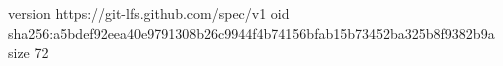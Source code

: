 version https://git-lfs.github.com/spec/v1
oid sha256:a5bdef92eea40e9791308b26c9944f4b74156bfab15b73452ba325b8f9382b9a
size 72
